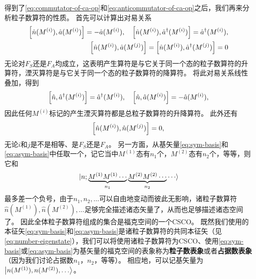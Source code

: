 \documentclass[hyperref, UTF8, a4paper]{ctexart}
\begin{document}
得到了\eqref{eq:commutator-of-ca-op}和\eqref{eq:anticommutator-of-ca-op}之后，我们再来分析粒子数算符的性质。
首先可以计算出对易关系
\begin{equation}
    \begin{aligned}
        \comm{\hat{n}(M^{(i)})}{\hat{a}(M^{(i)})} = - \hat{a}(M^{(i)}), \quad \comm{\hat{n}(M^{(i)})}{\hat{a}^\dagger(M^{(i)})} = \hat{a}^\dagger(M^{(i)}), \\
        \comm{\hat{n}(M^{(i)})}{\hat{a}(M^{(j)})} = \comm{\hat{n}(M^{(i)})}{\hat{a}^\dagger (M^{(j)})} = 0
        \label{eq:commutator-n-a}
    \end{aligned}
\end{equation}
无论对$F_S$还是$F_A$均成立，这表明产生算符是与它关于同一个态的粒子数算符的升算符，湮灭算符是与它关于同一个态的粒子数算符的降算符。
将此对易关系线性叠加，得到
\begin{equation}
    \comm{\hat{n}}{\hat{a}^\dagger (M^{(i)})} =  \hat{a}^\dagger (M^{(i)}), \quad \comm{\hat{n}}{\hat{a} (M^{(i)})} =  -\hat{a} (M^{(i)}),
    \label{eq:commutator-ntotal-a}
\end{equation}
因此任何$M^{(i)}$标记的产生湮灭算符都是总粒子数算符的升降算符。
此外还有
\begin{equation}
    \comm{\hat{n}(M^{(i)})}{\hat{n}(M^{(j)})} = 0,
    \label{eq:commutator-n-and-n}
\end{equation}
无论$i$和$j$是不是相等、是$F_S$还是$F_A$。
另一方面，从基矢量\eqref{eq:sym-basis}和\eqref{eq:asym-basis}中任取一个，记它当中$M^{(1)}$态有$n_1$个，$M^{(2)}$态有$n_2$个，等等，则它和
\[
    \ket*{n; \underbrace{M^{(1)} M^{(1)} \cdots}_{n_1} \underbrace{M^{(2)} M^{(2)} \cdots}_{n_2} \cdots} 
\]
最多差一个负号，由于$n_1, n_2, \ldots$可以自由地变动而彼此无影响，诸粒子数算符$\hat{n}(M^{(1)}), \hat{n}(M^{(2)}), \ldots$足够完全描述诸态矢量了，从而也足够描述诸态空间了。
因此全体粒子数算符组成的集合是福克空间的一个CSCO。
既然我们使用的本征矢\eqref{eq:sym-basis}和\eqref{eq:asym-basis}是诸粒子数算符的共同本征矢（见\eqref{eq:number-eigenstate}），我们可以将使用诸粒子数算符为CSCO、使用\eqref{eq:sym-basis}或\eqref{eq:asym-basis}为基矢量的福克空间的表象称为\textbf{粒子数表象}或者\textbf{占据数表象}（因为我们讨论占据数$n_1$，$n_2$，等等）。
相应地，可以记基矢量为$\ket{n(M^{(1)}), n(M^{(2)}), \ldots}$。
\end{document}
